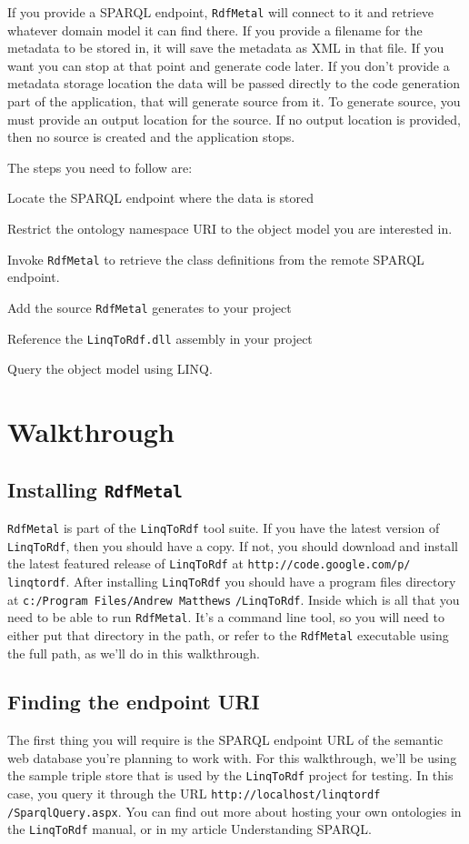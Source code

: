 \documentclass{article}
\def\spq{SPARQL}
\def\rm{\texttt{RdfMetal}}
\def\l2r{\texttt{LinqToRdf}}
\begin{document}
If you provide a \spq{} endpoint, \rm{} will connect to it and retrieve
whatever domain model it can find there. If you provide a filename for the
metadata to be stored in, it will save the metadata as XML in that file. If you
want you can stop at that point and generate code later. If you don't provide a
metadata storage location the data will be passed directly to the code
generation part of the application, that will generate source from it. To generate
source, you must provide an output location for the source. If no output
location is provided, then no source is created and the application stops.

The steps you need to follow are:

\begin{list}{-}
\item Locate the \spq{} endpoint where the data is stored
\item Restrict the ontology namespace URI to the object model you are interested in.
\item Invoke \rm{} to retrieve the class definitions from the remote \spq{} endpoint.
\item Add the source \rm{} generates to your project
\item Reference the \texttt{LinqToRdf.dll} assembly in your project
\item Query the object model using LINQ.
\end{list}

\section*{Walkthrough}

\subsection{Installing \rm{}}
\rm{} is part of the \l2r{} tool suite. If you have the latest version of
\l2r{}, then you should have a copy. If not, you should download and install
the latest featured release of \l2r{} at
\texttt{http://code.google.com/p/} \texttt{linqtordf}. After installing \l2r{} you
should have a program files directory at \texttt{c:/Program Files/Andrew
Matthews} \texttt{/LinqToRdf}.  Inside which is all that you need to be able to run \rm{}.
It's a command line tool, so you will need to either put that directory in the
path, or refer to the \rm{} executable using the full path, as we'll do in this
walkthrough.

\subsection{Finding the endpoint URI}
The first thing you will require is the \spq{} endpoint URL of the semantic web
database you're planning to work with. For this walkthrough, we'll be using the
sample triple store that is used by the \l2r{} project for testing. In this
case, you query it through the URL
\texttt{http://localhost/linqtordf} \texttt{/SparqlQuery.aspx}. You can find out more
about hosting your own ontologies in the \l2r{} manual, or in my article
Understanding \spq{}.
\end{document}
